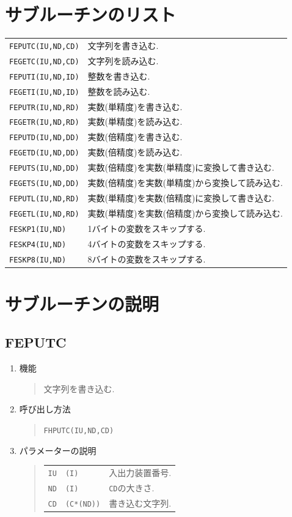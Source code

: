 \section{サブルーチンのリスト}
\begin{tabular}{lp{10cm}}
  {\tt FEPUTC(IU,ND,CD)} & 文字列を書き込む.\\
  {\tt FEGETC(IU,ND,CD)} & 文字列を読み込む.\\
  {\tt FEPUTI(IU,ND,ID)} & 整数を書き込む.\\
  {\tt FEGETI(IU,ND,ID)} & 整数を読み込む.\\
  {\tt FEPUTR(IU,ND,RD)} & 実数(単精度)を書き込む.\\
  {\tt FEGETR(IU,ND,RD)} & 実数(単精度)を読み込む.\\
  {\tt FEPUTD(IU,ND,DD)} & 実数(倍精度)を書き込む.\\
  {\tt FEGETD(IU,ND,DD)} & 実数(倍精度)を読み込む.\\
  {\tt FEPUTS(IU,ND,DD)} & 実数(倍精度)を実数(単精度)に変換して書き込む.\\
  {\tt FEGETS(IU,ND,DD)} & 実数(倍精度)を実数(単精度)から変換して読み込む.\\
  {\tt FEPUTL(IU,ND,RD)} & 実数(単精度)を実数(倍精度)に変換して書き込む.\\
  {\tt FEGETL(IU,ND,RD)} & 実数(単精度)を実数(倍精度)から変換して読み込む.\\
  {\tt FESKP1(IU,ND)}    & 1バイトの変数をスキップする.\\
  {\tt FESKP4(IU,ND)}    & 4バイトの変数をスキップする.\\
  {\tt FESKP8(IU,ND)}    & 8バイトの変数をスキップする.
\end{tabular}

\section{サブルーチンの説明}

\subsection{FEPUTC}
\begin{enumerate}
  \item 機能 
  \begin{quote}
   文字列を書き込む.
  \end{quote}
  \item 呼び出し方法 
  \begin{quote}
    {\tt FHPUTC(IU,ND,CD)}
  \end{quote}
  \item パラメーターの説明 
  \begin{quote}
    \begin{tabular}{llp{10cm}}
      {\tt IU}   & {\tt (I)} & 入出力装置番号. \\
      {\tt ND}   & {\tt (I)} & {\tt CD}の大きさ.\\
      {\tt CD}   & {\tt (C*(ND))} & 書き込む文字列.
    \end{tabular}
  \end{quote}
\end{enumerate}

